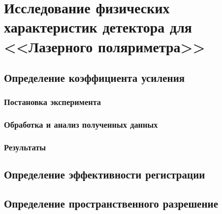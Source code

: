 \chapter{Исследование физических характеристик детектора для <<Лазерного поляриметра>>}
\section{Определение коэффициента усиления}
\subsection{Постановка эксперимента}
\subsection{Обработка и анализ полученных данных}
\subsection{Результаты}
\section{Определение эффективности регистрации}
\section{Определение пространственного разрешение}